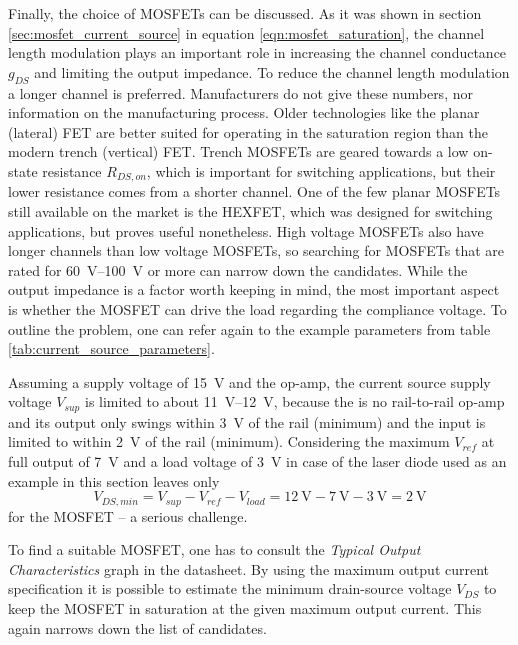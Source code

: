 Finally, the choice of MOSFETs can be discussed. As it was shown in section \ref{sec:mosfet_current_source} in equation \ref{eqn:mosfet_saturation}, the channel length modulation plays an important role in increasing the channel conductance $g_{DS}$ and limiting the output impedance. To reduce the channel length modulation a longer channel is preferred. Manufacturers do not give these numbers, nor information on the manufacturing process. Older technologies like the planar (lateral) FET are better suited for operating in the saturation region than the modern trench (vertical) FET. Trench MOSFETs are geared towards a low on-state resistance $R_{DS,on}$, which is important for switching applications, but their lower resistance comes from a shorter channel. One of the few planar MOSFETs still available on the market is the HEXFET, which was designed for switching applications, but proves useful nonetheless. High voltage MOSFETs also have longer channels than low voltage MOSFETs, so searching for MOSFETs that are rated for \qtyrange[range-units = single]{60}{100}{\V} or more can narrow down the candidates. While the output impedance is a factor worth keeping in mind, the most important aspect is whether the MOSFET can drive the load regarding the compliance voltage. To outline the problem, one can refer again to the example parameters from table \ref{tab:current_source_parameters}.

Assuming a supply voltage of \qty{15}{\V} and the  op-amp, the current source supply voltage $V_{sup}$ is limited to about \qtyrange[range-units = single]{11}{12}{\V}, because the  is no rail-to-rail op-amp and its output only swings within \qty{3}{\V} of the rail (minimum) and the input is limited to within \qty{2}{\V} of the rail (minimum). Considering the maximum $V_{ref}$ at full output of \qty{7}{\V} and a load voltage of \qty{3}{\V} in case of the  \cite{datasheet_thorlabs_780nm} laser diode used as an example in this section leaves only
\begin{equation}
    V_{DS,min} = V_{sup} - V_{ref} - V_{load} = \qty{12}{\V} - \qty{7}{\V} - \qty{3}{\V} = \qty{2}{\V} \label{eqn:minimum_mosfet_vds}
\end{equation}
for the MOSFET -- a serious challenge.

To find a suitable MOSFET, one has to consult the \textit{Typical Output Characteristics} graph in the datasheet. By using the maximum output current specification it is possible to estimate the minimum drain-source voltage $V_{DS}$ to keep the MOSFET in saturation at the given maximum output current. This again narrows down the list of candidates.

